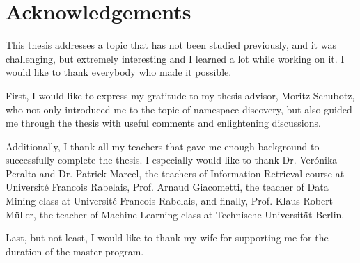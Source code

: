 \section*{Acknowledgements}

This thesis addresses a topic that has not been studied previously, and 
it was challenging, but extremely interesting and I learned a lot while working
on it. I would like to thank everybody who made it possible. 

First, I would like to express my gratitude to my thesis advisor, Moritz Schubotz, who not 
only introduced me to the topic of namespace discovery, but also guided me through 
the thesis with  useful comments and enlightening discussions.

Additionally, I thank all my teachers that gave me enough background to 
successfully complete the thesis. I especially would like to thank
Dr. Ver\'onika Peralta  and Dr. Patrick Marcel, the teachers of 
Information Retrieval course at Universit\'e Francois Rabelais, 
Prof. Arnaud Giacometti, the teacher of Data Mining class at Universit\'e Francois Rabelais, 
and finally, Prof. Klaus-Robert M\"uller, the teacher of Machine Learning
class at Technische Universit\"at Berlin.


Last, but not least, I would like to thank my wife for supporting me for the duration 
of the master program.
